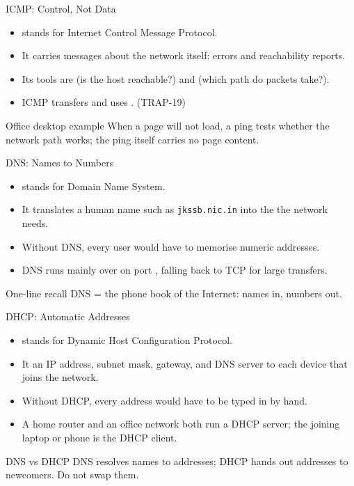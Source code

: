 \documentclass[aspectratio=169]{beamer}
\begin{document}
\begin{frame}{ICMP: Control, Not Data}
  \begin{itemize}
    \item {} stands for Internet Control Message Protocol.
    \item It carries  messages about the network
      itself: errors and reachability reports.
    \item Its tools are  (is the host reachable?) and
       (which path do packets take?).
    \item ICMP transfers  and uses . (TRAP-19)
  \end{itemize}
  \begin{block}{Office desktop example}
    When a page will not load, a ping tests whether the network path works;
    the ping itself carries no page content.
  \end{block}
\end{frame}

\begin{frame}{DNS: Names to Numbers}
  \begin{itemize}
    \item {} stands for Domain Name System.
    \item It translates a human name such as \texttt{jkssb.nic.in} into the
       the network needs.
    \item Without DNS, every user would have to memorise numeric addresses.
    \item DNS runs mainly over  on port , falling back to
      TCP for large transfers.
  \end{itemize}
  \begin{alertblock}{One-line recall}
    DNS = the phone book of the Internet: names in, numbers out.
  \end{alertblock}
\end{frame}

\begin{frame}{DHCP: Automatic Addresses}
  \begin{itemize}
    \item {} stands for Dynamic Host Configuration Protocol.
    \item It  an IP address, subnet mask, gateway,
      and DNS server to each device that joins the network.
    \item Without DHCP, every address would have to be typed in by hand.
    \item A home router and an office network both run a DHCP server; the
      joining laptop or phone is the DHCP client.
  \end{itemize}
  \begin{block}{DNS vs DHCP}
    DNS resolves names to addresses; DHCP hands out addresses to newcomers.
    Do not swap them.
  \end{block}
\end{frame}
\end{document}
